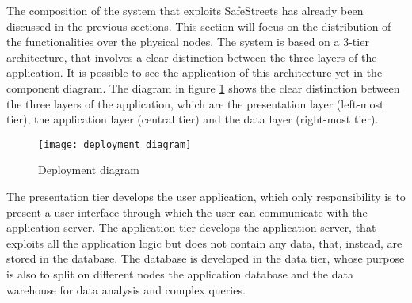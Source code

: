\documentclass[./main.tex]{subfiles}
\begin{document}
The composition of the system that exploits SafeStreets has already been
discussed in the previous sections. This section will focus on the distribution
of the functionalities over the physical nodes. The system is based on a 3-tier
architecture, that involves a clear distinction between the three layers of the
application. It is possible to see the application of this architecture yet in
the component diagram. The diagram in figure \ref{fig:deployment_diagram} shows
the clear distinction between the three layers of the application, which are the
presentation layer (left-most tier), the application layer (central tier) and the
data layer (right-most tier).

\begin{figure}[H]
\centering
\texttt{[image: deployment\_diagram]}
\caption{Deployment diagram}
\label{fig:deployment_diagram}
\end{figure}

The presentation tier develops the user application, which only responsibility is
to present a user interface through which the user can communicate with the
application server. The application tier develops the application server, that
exploits all the application logic but does not contain any data, that, instead,
are stored in the database. The database is developed in the data tier, whose
purpose is also to split on different nodes the application database and the data
warehouse for data analysis and complex queries.
\end{document}
